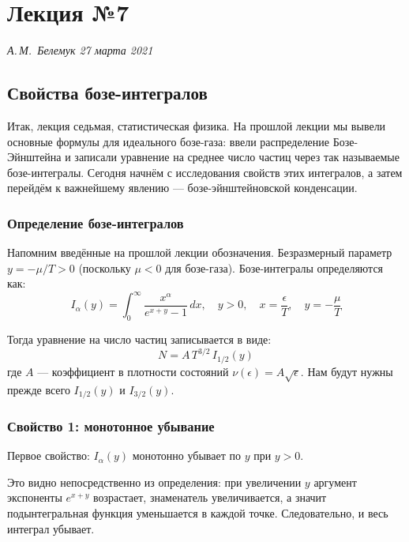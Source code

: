 \documentclass[../general/general]{subfiles}
\begin{document}
\chapter{Лекция №7}
\noindent\textit{А.\,М.~Белемук \hfill 27 марта 2021}
\vspace{1em}
\ifSubfilesClassLoaded{\tableofcontents\newpage}{}


\section{Свойства бозе-интегралов}

Итак, лекция седьмая, статистическая физика. На прошлой лекции мы вывели основные формулы для идеального бозе-газа: ввели распределение Бозе-Эйнштейна и записали уравнение на среднее число частиц через так называемые бозе-интегралы. Сегодня начнём с исследования свойств этих интегралов, а затем перейдём к важнейшему явлению --- бозе-эйнштейновской конденсации.

\subsection{Определение бозе-интегралов}

Напомним введённые на прошлой лекции обозначения. Безразмерный параметр $y = -\mu/T > 0$ (поскольку $\mu < 0$ для бозе-газа). Бозе-интегралы определяются как:
\begin{equation}
    I_\alpha(y) = \int_0^\infty \frac{x^\alpha}{e^{x+y} - 1}\, dx, \quad y > 0, \quad x = \frac{\epsilon}{T}, \quad y = -\frac{\mu}{T}
    \label{eq:bose_integral_def}
\end{equation}

Тогда уравнение на число частиц записывается в виде:
\begin{equation}
    N = A\,T^{3/2}\, I_{1/2}(y)
    \label{eq:N_bose}
\end{equation}
где $A$ --- коэффициент в плотности состояний $\nu(\epsilon) = A\sqrt{\epsilon}$. Нам будут нужны прежде всего $I_{1/2}(y)$ и $I_{3/2}(y)$.

\subsection{Свойство 1: монотонное убывание}

Первое свойство: $I_\alpha(y)$ монотонно убывает по $y$ при $y > 0$.

Это видно непосредственно из определения: при увеличении $y$ аргумент экспоненты $e^{x+y}$ возрастает, знаменатель увеличивается, а значит подынтегральная функция уменьшается в каждой точке. Следовательно, и весь интеграл убывает.
\end{document}
